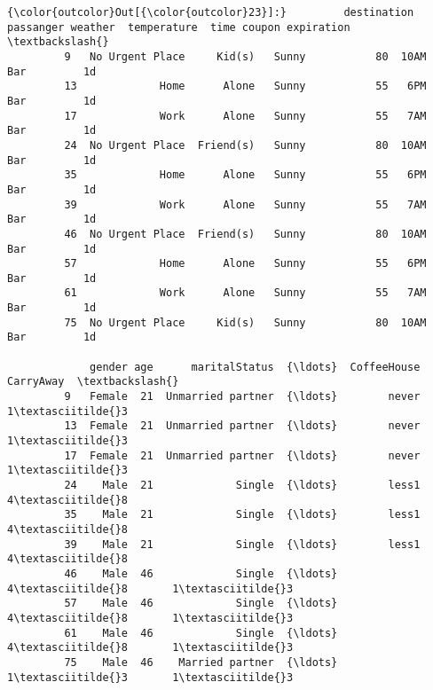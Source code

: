 \documentclass[11pt]{article}
\begin{document}
\begin{Verbatim}[commandchars=\\\{\}]
{\color{outcolor}Out[{\color{outcolor}23}]:}         destination  passanger weather  temperature  time coupon expiration  \textbackslash{}
         9   No Urgent Place     Kid(s)   Sunny           80  10AM    Bar         1d   
         13             Home      Alone   Sunny           55   6PM    Bar         1d   
         17             Work      Alone   Sunny           55   7AM    Bar         1d   
         24  No Urgent Place  Friend(s)   Sunny           80  10AM    Bar         1d   
         35             Home      Alone   Sunny           55   6PM    Bar         1d   
         39             Work      Alone   Sunny           55   7AM    Bar         1d   
         46  No Urgent Place  Friend(s)   Sunny           80  10AM    Bar         1d   
         57             Home      Alone   Sunny           55   6PM    Bar         1d   
         61             Work      Alone   Sunny           55   7AM    Bar         1d   
         75  No Urgent Place     Kid(s)   Sunny           80  10AM    Bar         1d   
         
             gender age      maritalStatus  {\ldots}  CoffeeHouse CarryAway  \textbackslash{}
         9   Female  21  Unmarried partner  {\ldots}        never       1\textasciitilde{}3   
         13  Female  21  Unmarried partner  {\ldots}        never       1\textasciitilde{}3   
         17  Female  21  Unmarried partner  {\ldots}        never       1\textasciitilde{}3   
         24    Male  21             Single  {\ldots}        less1       4\textasciitilde{}8   
         35    Male  21             Single  {\ldots}        less1       4\textasciitilde{}8   
         39    Male  21             Single  {\ldots}        less1       4\textasciitilde{}8   
         46    Male  46             Single  {\ldots}          4\textasciitilde{}8       1\textasciitilde{}3   
         57    Male  46             Single  {\ldots}          4\textasciitilde{}8       1\textasciitilde{}3   
         61    Male  46             Single  {\ldots}          4\textasciitilde{}8       1\textasciitilde{}3   
         75    Male  46    Married partner  {\ldots}          1\textasciitilde{}3       1\textasciitilde{}3   
         

\end{Verbatim}
\end{document}
